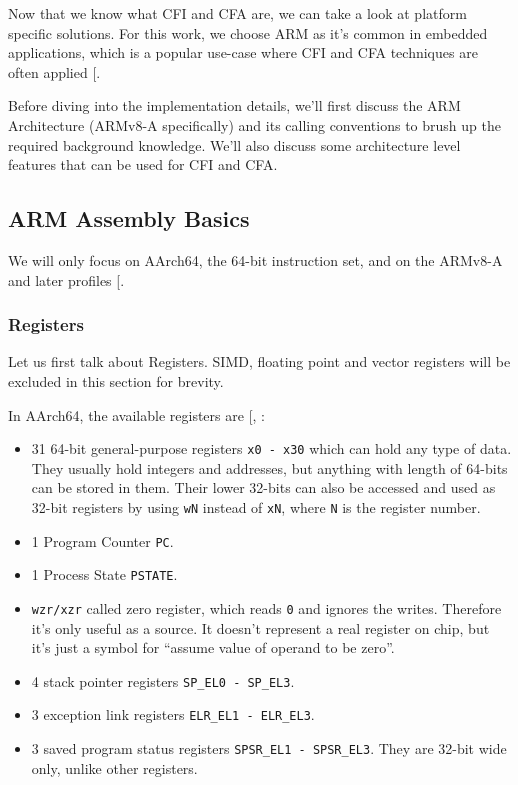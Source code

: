\documentclass[a4paper, nobind]{templates/ociamthesis}
\providecommand{\tightlist}{%
  \setlength{\itemsep}{0pt}\setlength{\parskip}{0pt}}
\begin{document}
Now that we know what CFI and CFA are, we can take a look at platform specific solutions.
For this work, we choose ARM as it's common in embedded applications,
which is a popular use-case where CFI and CFA techniques are often applied {[}\citeproc{ref-sok}{5}{]}.

Before diving into the implementation details, we'll first discuss the ARM Architecture
(ARMv8-A specifically) and its calling conventions to brush up the required background knowledge.
We'll also discuss some architecture level features that can be used for CFI and CFA.

\subsection{ARM Assembly Basics}\label{arm-assembly-basics}

We will only focus on AArch64, the 64-bit instruction set, and on the ARMv8-A
and later profiles {[}\citeproc{ref-arm-arch-manual}{11}{]}.

\subsubsection{Registers}\label{registers}

Let us first talk about Registers.
SIMD, floating point and vector registers will be excluded in this section for brevity.

In AArch64, the available registers are {[}, \citeproc{ref-arm-isa}{10}{]}:

\begin{itemize}
\tightlist
\item
  31 64-bit general-purpose registers \texttt{x0\ -\ x30} which can hold any type of data.
  They usually hold integers and addresses, but anything with length of 64-bits
  can be stored in them. Their lower 32-bits can also be accessed and used as
  32-bit registers by using \texttt{wN} instead of \texttt{xN}, where \texttt{N} is the register number.
\item
  1 Program Counter \texttt{PC}.
\item
  1 Process State \texttt{PSTATE}.
\item
  \texttt{wzr/xzr} called zero register,
  which reads \texttt{0} and ignores the writes. Therefore it's only useful as a source.
  It doesn't represent a real register on chip,
  but it's just a symbol for ``assume value of operand to be zero''.
\item
  4 stack pointer registers \texttt{SP\_EL0\ -\ SP\_EL3}.
\item
  3 exception link registers \texttt{ELR\_EL1\ -\ ELR\_EL3}.
\item
  3 saved program status registers \texttt{SPSR\_EL1\ -\ SPSR\_EL3}. They are 32-bit wide only,
  unlike other registers.
\end{itemize}
\end{document}
